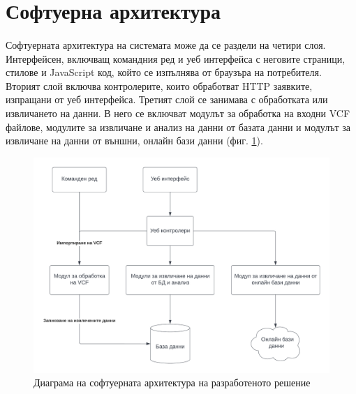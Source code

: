 \documentclass[pdftex,cyrillic,14pt,a4page,twoside,openright]{extreport}
\begin{document}
\section{Софтуерна архитектура}
\paragraph{}
Софтуерната архитектура на системата може да се раздели на четири слоя. Интерфейсен, включващ командния ред и уеб интерфейса с неговите страници, стилове и JavaScript код, който се изпълнява от браузъра на потребителя. Вторият слой включва контролерите, които обработват HTTP заявките, изпращани от уеб интерфейса. Третият слой се занимава с обработката или извличането на данни. В него се включват модулът за обработка на входни VCF файлове, модулите за извличане и анализ на данни от базата данни и модулът за извличане на данни от външни, онлайн бази данни (фиг. \ref{fig:software_architecture}).

\begin{figure}[h]
  \centering
  \includegraphics[width=17cm]{figures/software_architecture}
  \caption {Диаграма на софтуерната архитектура на разработеното решение}
  \label{fig:software_architecture}
\end{figure}
\end{document}
